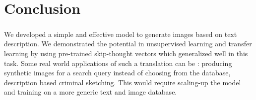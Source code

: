 %
%
\let\textcircled=\pgftextcircled
\chapter{Conclusion}
\label{chap:conclusion}
\paragraph{}

We developed a simple and effective model to generate images based on text description. We demonstrated the potential in unsupervised learning and transfer learning by using pre-trained skip-thought vectors which generalized well in this task. Some real world applications of such a translation can be : producing synthetic images for a search query instead of choosing from the database, description based criminal sketching. This would require scaling-up the model and training on a more generic text and image database.
